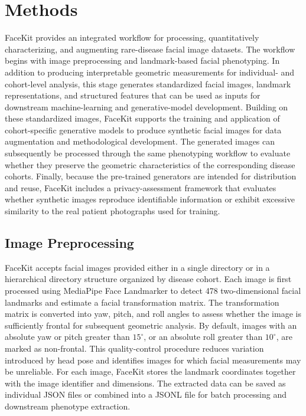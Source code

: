 \documentclass[11pt]{article}
\begin{document}
\section{Methods}

FaceKit provides an integrated workflow for processing, quantitatively characterizing, and augmenting rare-disease facial image datasets. The workflow begins with image preprocessing and landmark-based facial phenotyping. In addition to producing interpretable geometric measurements for individual- and cohort-level analysis, this stage generates standardized facial images, landmark representations, and structured features that can be used as inputs for downstream machine-learning and generative-model development. Building on these standardized images, FaceKit supports the training and application of cohort-specific generative models to produce synthetic facial images for data augmentation and methodological development. The generated images can subsequently be processed through the same phenotyping workflow to evaluate whether they preserve the geometric characteristics of the corresponding disease cohorts. Finally, because the pre-trained generators are intended for distribution and reuse, FaceKit includes a privacy-assessment framework that evaluates whether synthetic images reproduce identifiable information or exhibit excessive similarity to the real patient photographs used for training.


\subsection{Image Preprocessing}

FaceKit accepts facial images provided either in a single directory or in a hierarchical directory structure organized by disease cohort. Each image is first processed using MediaPipe Face Landmarker to detect 478 two-dimensional facial landmarks and estimate a facial transformation matrix. The transformation matrix is converted into yaw, pitch, and roll angles to assess whether the image is sufficiently frontal for subsequent geometric analysis. By default, images with an absolute yaw or pitch greater than $15^{\circ}$, or an absolute roll greater than $10^{\circ}$, are marked as non-frontal. This quality-control procedure reduces variation introduced by head pose and identifies images for which facial measurements may be unreliable. For each image, FaceKit stores the landmark coordinates together with the image identifier and dimensions. The extracted data can be saved as individual JSON files or combined into a JSONL file for batch processing and downstream phenotype extraction.
\end{document}
